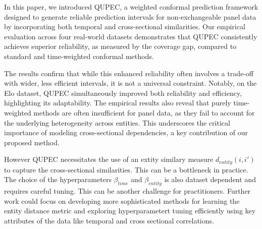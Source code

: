 
In this paper, we introduced QUPEC, a weighted conformal prediction framework designed to generate reliable prediction intervals for non-exchangeable panel data by incorporating both temporal and cross-sectional similarities. Our empirical evaluation across four real-world datasets demonstrates that QUPEC consistently achieves superior reliability, as measured by the coverage gap, compared to standard and time-weighted conformal methods.

The results confirm that while this enhanced reliability often involves a trade-off with wider, less efficient intervals, it is not a universal constraint. Notably, on the Elo dataset, QUPEC simultaneously improved both reliability and efficiency, highlighting its adaptability. The empirical results also reveal that purely time-weighted methods are often insufficient for panel data, as they fail to account for the underlying heterogeneity across entities. This underscores the critical importance of modeling cross-sectional dependencies, a key contribution of our proposed method.

However QUPEC necessitates the use of an extity similary measure $d_{entity}(i, i')$ to capture the cross-sectional similarities. This can be a bottleneck in practice. The choice of the hyperparameters $\beta_{time}$ and $\beta_{entity}$ is also dataset dependent and requires careful tuning. This can be another challenge for practitioners. Further work could focus on developing more sophisticated methods for learning the entity distance metric and exploring hyperparametert tuning efficiently using key attributes of the data like temporal and cross sectional correlations.
